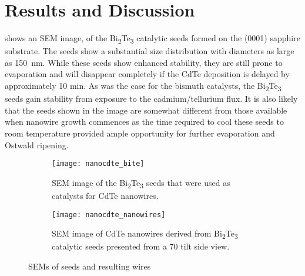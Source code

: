 \section{Results and Discussion}
 shows an SEM image, of the Bi\textsubscript{2}Te\textsubscript{3} catalytic seeds formed on the (0001) sapphire substrate.
The seeds show a substantial size distribution with diameters as large as 150~nm.
While these seeds show enhanced stability, they are still prone to evaporation and will disappear completely if the CdTe deposition is delayed by approximately 10 min.
As was the case for the bismuth catalysts, the Bi\textsubscript{2}Te\textsubscript{3} seeds gain stability from exposure to the cadmium/tellurium flux.
It is also likely that the seeds shown in the image are somewhat different from those available when nanowire growth commences as the time required to cool these seeds to room temperature provided ample opportunity for further evaporation and Ostwald ripening.
\begin{figure}
 \centering
 \begin{subfigure}[t]{0.5\textwidth}
  \centering \texttt{[image: nanocdte\_bite]}
  \caption{\label{fig:nanocdte_bite}SEM image of the Bi\textsubscript{2}Te\textsubscript{3} seeds that were used as catalysts for CdTe nanowires.}
 \end{subfigure}%
 \begin{subfigure}[t]{0.5\textwidth}
  \centering \texttt{[image: nanocdte\_nanowires]}
  \caption{\label{fig:nanocdte_nanowires} SEM image of CdTe nanowires derived from Bi\textsubscript{2}Te\textsubscript{3} catalytic seeds presented from a 70\degree{} tilt side view.}
 \end{subfigure}
 \caption{\label{fig:nanocdte_sem}SEMs of seeds and resulting wires}
\end{figure}

